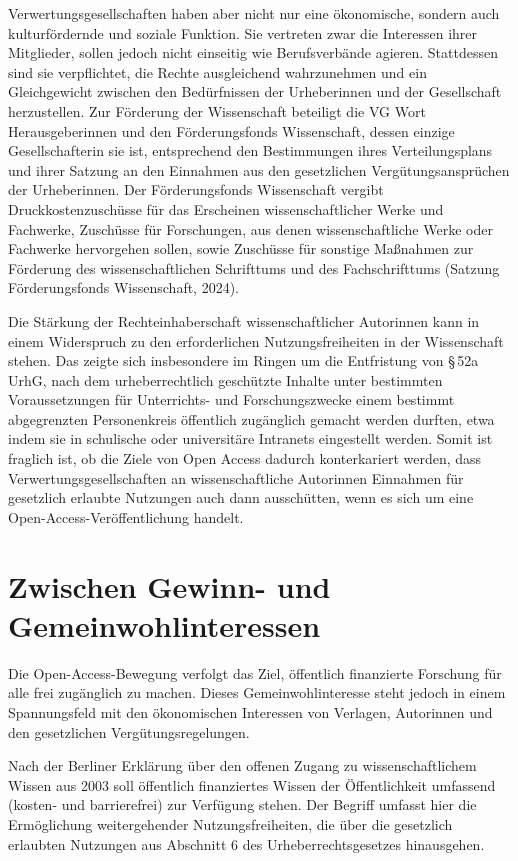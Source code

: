 \documentclass[a4paper,
fontsize=11pt,
oneside,
numbers=noperiodatend,
parskip=half-,
bibliography=totoc,
final
]{scrartcl}
\begin{document}
Verwertungsgesellschaften haben aber nicht nur eine ökonomische, sondern
auch kulturfördernde und soziale Funktion. Sie vertreten zwar die
Interessen ihrer Mitglieder, sollen jedoch nicht einseitig wie
Berufsverbände agieren. Stattdessen sind sie verpflichtet, die Rechte
ausgleichend wahrzunehmen und ein Gleichgewicht zwischen den
Bedürfnissen der Urheberinnen und der Gesellschaft herzustellen. Zur
Förderung der Wissenschaft beteiligt die VG Wort Herausgeberinnen und
den Förderungsfonds Wissenschaft, dessen einzige Gesellschafterin sie
ist, entsprechend den Bestimmungen ihres Verteilungsplans und ihrer
Satzung an den Einnahmen aus den gesetzlichen Vergütungsansprüchen der
Urheberinnen. Der Förderungsfonds Wissenschaft vergibt
Druckkostenzuschüsse für das Erscheinen wissenschaftlicher Werke und
Fachwerke, Zuschüsse für Forschungen, aus denen wissenschaftliche Werke
oder Fachwerke hervorgehen sollen, sowie Zuschüsse für sonstige
Maßnahmen zur Förderung des wissenschaftlichen Schrifttums und des
Fachschrifttums (Satzung Förderungsfonds Wissenschaft, 2024).

Die Stärkung der Rechteinhaberschaft wissenschaftlicher Autorinnen kann
in einem Widerspruch zu den erforderlichen Nutzungsfreiheiten in der
Wissenschaft stehen. Das zeigte sich insbesondere im Ringen um die
Entfristung von §\,52a UrhG, nach dem urheberrechtlich geschützte Inhalte
unter bestimmten Voraussetzungen für Unterrichts- und Forschungszwecke
einem bestimmt abgegrenzten Personenkreis öffentlich zugänglich gemacht
werden durften, etwa indem sie in schulische oder universitäre Intranets
eingestellt werden. Somit ist fraglich ist, ob die Ziele von Open Access
dadurch konterkariert werden, dass Verwertungsgesellschaften an
wissenschaftliche Autorinnen Einnahmen für gesetzlich erlaubte Nutzungen
auch dann ausschütten, wenn es sich um eine Open-Access-Veröffentlichung
handelt.

\section{Zwischen Gewinn- und
Gemeinwohlinteressen}\label{zwischen-gewinn--und-gemeinwohlinteressen}

Die Open-Access-Bewegung verfolgt das Ziel, öffentlich finanzierte
Forschung für alle frei zugänglich zu machen. Dieses Gemeinwohlinteresse
steht jedoch in einem Spannungsfeld mit den ökonomischen Interessen von
Verlagen, Autorinnen und den gesetzlichen Vergütungsregelungen.

Nach der Berliner Erklärung über den offenen Zugang zu
wissenschaftlichem Wissen aus 2003 soll öffentlich finanziertes Wissen
der Öffentlichkeit umfassend (kosten- und barrierefrei) zur Verfügung
stehen. Der Begriff umfasst hier die Ermöglichung weitergehender
Nutzungsfreiheiten, die über die gesetzlich erlaubten Nutzungen aus
Abschnitt 6 des Urheberrechtsgesetzes hinausgehen.
\end{document}
